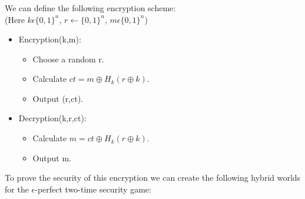 \documentclass{article}
\begin{document}
\subsubsection{}
We can define the following encryption scheme:\\
(Here $k\epsilon\{0,1\}^{n}$, $r\leftarrow\{0,1\}^{n}$, $m\epsilon\{0,1\}^{n}$)
\begin{itemize}
    \item Encryption(k,m):
        \begin{itemize}
            \item Choose a random r.
            \item Calculate $ct=m\oplus H_{k}(r\oplus k)$.
            \item Output (r,ct).
        \end{itemize}
    \item Decryption(k,r,ct):
        \begin{itemize}
            \item Calculate $m=ct\oplus H_{k}(r\oplus k)$.
            \item Output m.
        \end{itemize}
\end{itemize}
To prove the security of this encryption we can create the following hybrid worlds for the $\epsilon$-perfect two-time security game:
\end{document}
